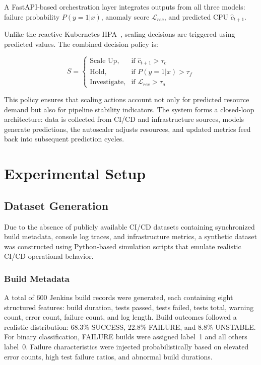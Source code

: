 \documentclass[conference]{IEEEtran}
\begin{document}
A FastAPI-based orchestration layer integrates outputs from all three models: failure probability $P(y\!=\!1|x)$, anomaly score $\mathcal{L}_{rec}$, and predicted CPU $\hat{c}_{t+1}$.

Unlike the reactive Kubernetes HPA~\cite{kubernetesDocs}, scaling decisions are triggered using predicted values. The combined decision policy is:

\begin{equation}
S =
\begin{cases}
\text{Scale Up}, & \text{if } \hat{c}_{t+1} > \tau_c \\
\text{Hold}, & \text{if } P(y\!=\!1|x) > \tau_f \\
\text{Investigate}, & \text{if } \mathcal{L}_{rec} > \tau_a
\end{cases}
\end{equation}

This policy ensures that scaling actions account not only for predicted resource demand but also for pipeline stability indicators. The system forms a closed-loop architecture: data is collected from CI/CD and infrastructure sources, models generate predictions, the autoscaler adjusts resources, and updated metrics feed back into subsequent prediction cycles.

\section{Experimental Setup}

\subsection{Dataset Generation}

Due to the absence of publicly available CI/CD datasets containing synchronized build metadata, console log traces, and infrastructure metrics, a synthetic dataset was constructed using Python-based simulation scripts that emulate realistic CI/CD operational behavior.

\subsubsection{Build Metadata}

A total of 600 Jenkins build records were generated, each containing eight structured features: build duration, tests passed, tests failed, tests total, warning count, error count, failure count, and log length. Build outcomes followed a realistic distribution: 68.3\% SUCCESS, 22.8\% FAILURE, and 8.8\% UNSTABLE. For binary classification, FAILURE builds were assigned label~1 and all others label~0. Failure characteristics were injected probabilistically based on elevated error counts, high test failure ratios, and abnormal build durations.
\end{document}
